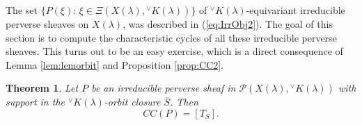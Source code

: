 \documentclass[a4paper, 11pt]{article}
\newtheorem{theo}{Theorem}[section]
\begin{document}
The set $\{P(\xi):\, \xi\in
\Xi(X(\lambda),{}^{\vee}K(\lambda)) \}$ of
${}^{\vee}K(\lambda)$-equivariant irreducible perverse sheaves on
$X(\lambda)$, was described in (\ref{eq:IrrObj2}). 
The goal of this section is to compute the characteristic cycles of all  
these irreducible perverse sheaves. This turns out to be an easy exercise,
which is a direct consequence of Lemma \ref{lem:lemorbit}  and
Proposition \ref{prop:CC2}. 
\begin{theo}\label{theo:CCsNonintegral}
Let $P$ be an irreducible perverse sheaf in
$\mathcal{P}(X(\lambda),{}^{\vee}K(\lambda))$   
with support in the ${}^{\vee}K(\lambda)$-orbit closure
$\overline{S}$. Then 
\begin{equation}\label{eq:CCnonintegral}
CC(P)=[T_S].
\end{equation}
\end{theo}
\end{document}
